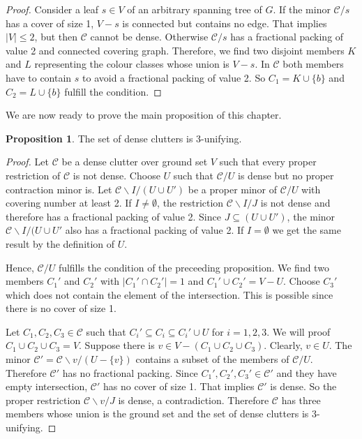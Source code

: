 \documentclass[a4paper, 12pt, twoside=false]{scrbook}
\theoremstyle{definition}
\newtheorem{proposition}{Proposition}
\begin{document}
\begin{proof}
       Consider a leaf $s \in V$ of an arbitrary spanning tree of $G$.
       If the minor $\mathcal{C} / s$ has a cover of size 1, $V - s$ is connected but contains no edge.
       That implies $|V| \leq 2$, but then $\mathcal{C}$ cannot be dense.
       Otherwise $\mathcal{C} / s$ has a fractional packing of value 2 and connected covering graph.
       Therefore, we find two disjoint members $K$ and $L$ representing the colour classes whose union is $V-s$.
       In $\mathcal{C}$ both members have to contain $s$ to avoid a fractional packing of value 2.
       So $C_1=K\cup \{b\}$ and $C_2=L\cup \{b\}$ fulfill the condition.
   \end{proof}

   We are now ready to prove the main proposition of this chapter.
   \begin{proposition}
       The set of dense clutters is 3-unifying.
   \end{proposition}

   \begin{proof}
       Let $\mathcal{C}$ be a dense clutter over ground set $V$ such that every proper restriction of $\mathcal{C}$ is not dense.
       Choose $U$ such that $\mathcal{C} / U$ is dense but no proper contraction minor is.
       Let $\mathcal{C} \backslash I / (U \cup U')$ be a proper minor of $\mathcal{C} /U$ with covering number at least 2.
       If $I \neq \emptyset$, the restriction $\mathcal{C} \backslash I / J$ is not dense and therefore has a fractional packing of value 2.
       Since $J \subseteq (U \cup U')$, the minor $\mathcal{C} \backslash I / (U \cup U'$ also has a fractional packing of value 2.
       If $I=\emptyset$ we get the same result by the definition of $U$.

       Hence, $\mathcal{C}/U$ fulfills the condition of the preceeding proposition.
       We find two members $C_1'$ and $C_2'$ with $|C_1' \cap C_2'| = 1$ and $C_1' \cup C_2' = V - U$.
       Choose $C_3'$ which does not contain the element of the intersection.
       This is possible since there is no cover of size 1.

       Let $C_1, C_2, C_3 \in \mathcal{C}$ such that $C_i' \subseteq C_i \subseteq C_i' \cup U$ for $i=1,2,3$.
       We will proof $C_1 \cup C_2 \cup C_3 = V$.
       Suppose there is $v \in V-(C_1 \cup C_2 \cup C_3)$.
       Clearly, $v \in U$.
       The minor $\mathcal{C'} = \mathcal{C} \backslash v / (U-\{v\})$ contains a subset of the members of $\mathcal{C}/U$.
       Therefore $\mathcal{C'}$ has no fractional packing.
       Since $C_1', C_2', C_3' \in \mathcal{C'}$ and they have empty intersection, $\mathcal{C'}$ has no cover of size 1.
       That implies $\mathcal{C'}$ is dense.
       So the proper restriction $\mathcal{C}\backslash v / J$ is dense, a contradiction.
       Therefore $\mathcal{C}$ has three members whose union is the ground set and the set of dense clutters is 3-unifying.
   \end{proof}
\end{document}

